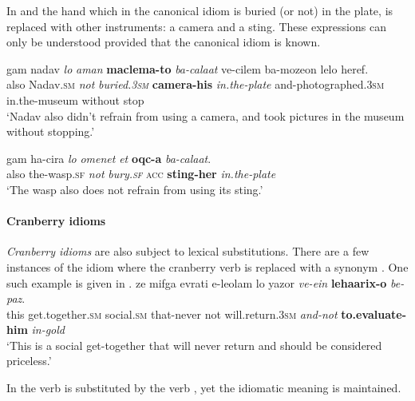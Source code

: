 \documentclass[output=paper]{langsci/langscibook}
\begin{document}
In  and  the hand which in the canonical idiom is buried (or not) in the plate, is replaced with other instruments: a camera and a sting. These expressions can only be understood provided that the canonical idiom is known.

    \ea\label{she:taman-sub-NP}
        \gll gam nadav \textit{lo} \textit{{\tet}aman} \textbf{maclema-to} \textit{ba-cala{\het}at} ve-cilem ba-moze{\alef}on lelo heref.\\
            also Nadav.\textsc{sm} \textit{not} \textit{buried.\textsc{3sm}} \textbf{camera-his} \textit{in.the-plate} and-photographed.\textsc{3sm} in.the-museum without stop\\
        \glt `Nadav also didn't refrain from using a camera, and took pictures in the museum without stopping.'
    \z

    \ea\label{she:taman-sub-PP}
        \gll gam ha-cir{\ayin}a \textit{lo} \textit{{\tet}omenet} \textit{{\alef}et} \textbf{{\ayinB}oqc-a} \textit{ba-cala{\het}at}.\\
            also the-wasp.\textsc{sf} \textit{not} \textit{bury.\textsc{sf}} \textsc{acc} \textbf{sting-her} \textit{in.the-plate}\\
        \glt `The wasp also does not refrain from using its sting.'
    \z

\paragraph*{Cranberry idioms}

\textit{Cranberry idioms} are also subject to lexical substitutions. There are a few instances of the idiom  where the cranberry verb  is replaced with a  synonym . One such example is given in .
	\ea\label{she:yesula-sub}
    	\gll ze mifga{\shin} {\het}evrati {\shin}e-le{\ayin}olam lo ya{\het}zor \textit{ve-{\alef}ein} \textbf{leha{\ayinB}arix-o} \textit{be-paz}.\\
    	   this get.together.\textsc{sm} social.\textsc{sm} that-never not will.return.\textsc{3sm} \textit{and-not} \textbf{to.evaluate-him} \textit{in-gold}\\
    	\glt `This is a social get-together that will never return and should be considered priceless.'
	\z

In  the verb  is substituted by the verb , yet the idiomatic meaning is maintained.
\end{document}
